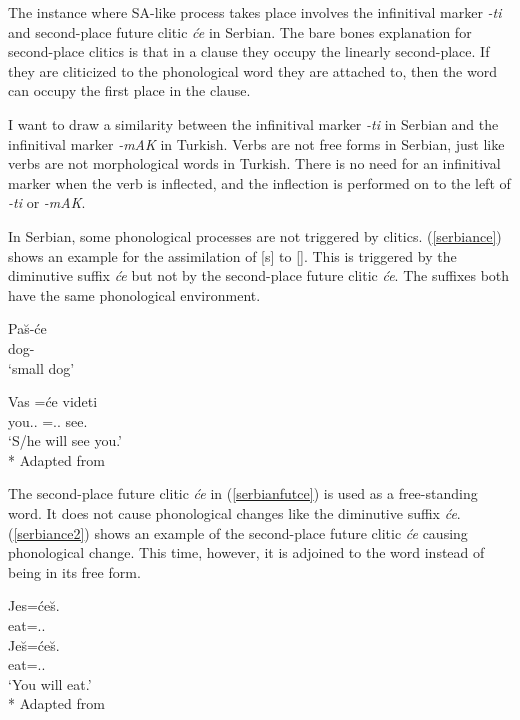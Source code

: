 The instance where SA-like process takes place involves the infinitival marker \textit{-ti} and second-place future clitic \textit{\'{c}e} in Serbian. The bare bones explanation for second-place clitics is that in a clause they occupy the linearly second-place. If they are cliticized to the phonological word they are attached to, then the word can occupy the first place in the clause.

I want to draw a similarity between the infinitival marker \textit{-ti} in Serbian and the infinitival marker \textit{-mAK} in Turkish. Verbs are not free forms in Serbian, just like verbs are not morphological words in Turkish. There is no need for an infinitival marker when the verb is inflected, and the inflection is performed on to the left of \textit{-ti} or \textit{-mAK}.

In Serbian, some phonological processes are not triggered by clitics. (\ref{serbiance}) shows an example for the assimilation of [s] to [\textesh]. This is  triggered by the diminutive suffix \textit{\'{c}e} but not by the second-place future clitic \textit{\'{c}e}. The suffixes both have the same phonological environment.

\begin{exe}
    \ex \label{serbiance}
    \begin{xlist}
        \ex \gll Pa\u{s}-\'{c}e \\ 
        dog-{\Dim} \\
        \glt `small dog'
        
        \ex \label{serbianfutce} \gll Vas =\'{c}e videti \\ 
        you.{\Pl}.{\Acc} ={\Aux}.{\Tsg}.{\Fut} see.{\Inf} \\
        \glt `S/he will see you.'\\*
        \hfill Adapted from \citet{despic2017suspended}
    \end{xlist}
\end{exe}

The second-place future clitic \textit{\'{c}e} in (\ref{serbianfutce}) is used as a free-standing word. It does not cause phonological changes like the diminutive suffix \textit{\'{c}e}. (\ref{serbiance2}) shows an example of the second-place future clitic \textit{\'{c}e} causing phonological change. This time, however, it is adjoined to the word instead of being in its free form.

\begin{exe}
    \ex \label{serbiance2}
    \begin{xlist}
        \ex \gll *Jes=\'{c}e\u{s}. \\ 
        eat={\Aux}.{\Ssg}.{\Fut} \\
    
        \ex \gll Je\u{s}=\'{c}e\u{s}. \\ 
        eat={\Aux}.{\Ssg}.{\Fut} \\
        \glt `You will eat.'\\*
        \hfill Adapted from \citet{despic2017suspended}
    \end{xlist}
\end{exe}


